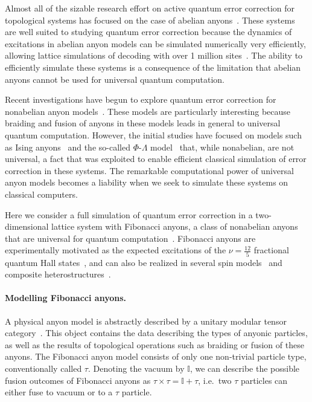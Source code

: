 \documentclass[aps, prl, letterpaper, twocolumn, superscriptaddress, notitlepage]{revtex4-1}
\begin{document}
Almost all of the sizable research effort on active quantum error correction for topological 
systems has focused on the case of abelian anyons~\cite{Terhal2014}. These systems are 
well suited to studying quantum error correction because the dynamics of excitations in 
abelian anyon models can be simulated numerically very efficiently, allowing lattice 
simulations of decoding with over 1 million sites~\cite{Duclos-Cianci2010}. The ability to 
efficiently simulate these systems is a consequence of the limitation that abelian anyons 
cannot be used for universal quantum computation. 

Recent investigations have begun to explore quantum error correction for nonabelian anyon 
models~\cite{Brell2013, Wootton2013, Hutter2014}. These models are particularly interesting 
because braiding and fusion of anyons in these models leads in general to universal quantum 
computation. However, the initial studies have focused on models such as Ising 
anyons~\cite{Brell2013} and the so-called $\Phi$-$\Lambda$ 
model~\cite{Wootton2013, Hutter2014} that, while nonabelian, are not universal, a fact 
that was exploited to enable efficient classical simulation of error correction in these systems. 
The remarkable computational power of universal anyon models becomes a liability when we 
seek to simulate these systems on classical computers. 

Here we consider a full simulation of quantum error correction in a two-dimensional lattice 
system with Fibonacci anyons, a class of nonabelian anyons that are universal for quantum 
computation~\cite{Wang2010b}. Fibonacci anyons are experimentally motivated as the 
expected excitations of the $\nu=\frac{12}{5}$ fractional quantum Hall 
states~\cite{Slingerland2001}, and can also be realized in several spin 
models~\cite{Levin2005, Kapit2013, Palumbo2014} and composite heterostructures~\cite{Mong2014}.


\paragraph{Modelling Fibonacci anyons.}

A physical anyon model is abstractly described by a unitary modular tensor 
category~\cite{Wang2010b}. This object contains the data describing the types of anyonic 
particles, as well as the results of topological operations such as braiding or fusion of these 
anyons. The Fibonacci anyon model consists of only one non-trivial particle type, 
conventionally called $\tau$. Denoting the vacuum by $\mathbb{I}$, we can describe the 
possible fusion outcomes of Fibonacci anyons as $\tau\times\tau=\mathbb{I}+\tau$, i.e.~two 
$\tau$ particles can either fuse to vacuum or to a $\tau$ particle.
\end{document}
